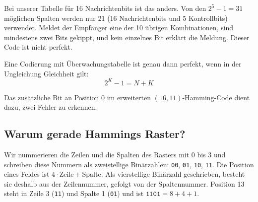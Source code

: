 Bei unserer Tabelle für 16 Nachrichtenbits ist das anders. Von den
\(2^5-1=31\) möglichen Spalten werden nur 21 (16 Nachrichtenbits und 5 Kontrollbits) verwendet. Meldet der
Empfänger eine der 10 übrigen Kombinationen, sind mindestens zwei
Bits gekippt, und kein einzelnes Bit erklärt die Meldung. Dieser
Code ist nicht perfekt.

\begin{myremark}
    Eine Codierung mit Überwachungstabelle ist genau dann perfekt,
    wenn in der Ungleichung Gleichheit gilt:
    \[
        2^K-1=N+K
    \]
\end{myremark}

Das zusätzliche Bit an Position 0 im erweiterten
\((16,11)\)-Hamming-Code dient dazu, zwei Fehler zu erkennen.

\subsection*{Warum gerade Hammings Raster?}

Wir nummerieren die Zeilen und die Spalten des Rasters mit 0 bis 3
und schreiben diese Nummern als zweistellige Binärzahlen: \texttt{00},
\texttt{01}, \texttt{10}, \texttt{11}. Die Position eines Feldes ist
\(4\cdot\text{Zeile}+\text{Spalte}\). Als vierstellige Binärzahl
geschrieben, besteht sie deshalb aus der Zeilennummer, gefolgt von der
Spaltennummer. Position 13 steht in Zeile 3 (\texttt{11}) und Spalte 1
(\texttt{01}) und ist \(\texttt{1101}=8+4+1\).

\begin{center}
\end{center}

